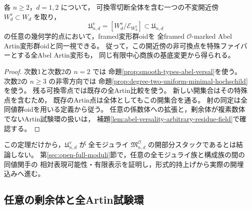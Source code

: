 \begin{theorem}
\label{thm:all-points-abel-artin-versality}
各 $n\ge2$，$d=1,2$ について，
可換零切断全体を含む一つの不変開近傍
$W_d^{\mathrm v}\subset W_d$ を取り，
\[
 \mathfrak U_{n,d}^{\mathrm v}
 =[W_d^{\mathrm v}/\mathcal E_{W_d^{\mathrm v}}]
 \subset\mathfrak U_{n,d}
\]
の任意の幾何学的点において，framed変形群oidを
全framed $\mathcal O$-marked Abel Artin変形群oidと同一視できる。
従って，この開近傍の非可換点を特殊ファイバーとする全Abel Artin変形も，
同じ有限中心商族の基底変更から得られる。
\end{theorem}
\begin{proof}
次数1と次数2の $n=2$ では
命題\ref{prop:smooth-types-abel-versal}を使う。
次数2の $n\ge3$ の非零方向では
命題\ref{prop:degree-two-uniform-minimal-hochschild}を使う。
残る可換零点では既存の全Artin比較を使う。
新しい開集合はその特殊点を含むため，
既存のArtin点は全体としてもこの開集合を通る。
射の同定は全同値群oidを用いる定義から従う。
任意の係数体への拡張と，剰余体が複素数体でないArtin試験環の扱いは，
補題\ref{lem:abel-versality-arbitrary-residue-field}で確認する。
\end{proof}

\begin{remark}
この定理だけから，$\mathfrak U_{n,d}^{\mathrm v}$ が
全モジュライ $\mathfrak M^{\mathcal O}_{n,d}$ の開部分スタックであるとは結論しない。
第\ref{sec:open-full-moduli}節で，任意の全モジュライ族と構成族の間の同値関手の
相対表現可能性・有限表示を証明し，形式的持上げから実際の開埋込みへ進む。
\end{remark}


\subsection{任意の剰余体と全Artin試験環}

